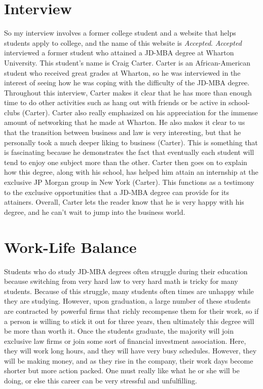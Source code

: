 \begin{multicols}{2}
\section{Interview}
	So my interview involves a former college student and a website that helps students apply to college, and the name of this website is \textit{Accepted}. \textit{Accepted} interviewed a former student who attained a JD-MBA degree at Wharton University. This student’s name is Craig Carter. Carter is an African-American student who received great grades at Wharton, so he was interviewed in the interest of seeing how he was coping with the difficulty of the JD-MBA degree. Throughout this interview, Carter makes it clear that he has more than enough time to do other activities such as hang out with friends or be active in school-clubs (Carter). Carter also really emphasized on his appreciation for the immense amount of networking that he made at Wharton. He also makes it clear to us that the transition between business and law is very interesting, but that he personally took a much deeper liking to business (Carter). This is something that is fascinating because he demonstrates the fact that eventually each student will tend to enjoy one subject more than the other. Carter then goes on to explain how this degree, along with his school, has helped him attain an internship at the exclusive JP Morgan group in New York (Carter). This functions as a testimony to the exclusive opportunities that a JD-MBA degree can provide for its attainers. Overall, Carter lets the reader know that he is very happy with his degree, and he can't wait to jump into the business world. 

\section{Work-Life Balance}
	Students who do study JD-MBA degrees often struggle during their education because switching from very hard law to very hard math is tricky for many students. Because of this struggle, many students often times are unhappy while they are studying. However, upon graduation, a large number of these students are contracted by powerful firms that richly recompense them for their work, so if a person is willing to stick it out for three years, then ultimately this degree will be more than worth it. Once the students graduate, the majority will join exclusive law firms or join some sort of financial investment association. Here, they will work long hours, and they will have very busy schedules. However, they will be making money, and as they rise in the company, their work days become shorter but more action packed. One must really like what he or she will be doing, or else this career can be very stressful and unfulfilling. 
\end{multicols}